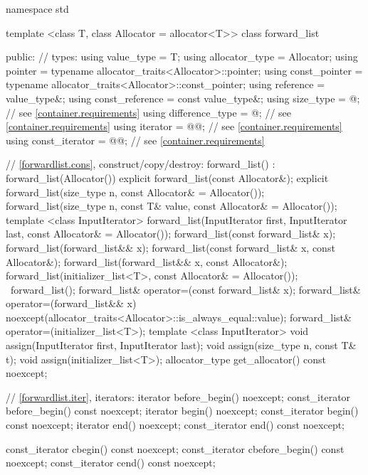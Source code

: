 \begin{codeblock}
namespace std {
  template <class T, class Allocator = allocator<T>>
  class forward_list {
  public:
    // types:
    using value_type      = T;
    using allocator_type  = Allocator;
    using pointer         = typename allocator_traits<Allocator>::pointer;
    using const_pointer   = typename allocator_traits<Allocator>::const_pointer;
    using reference       = value_type&;
    using const_reference = const value_type&;
    using size_type       = @\impdef@; // see \ref{container.requirements}
    using difference_type = @\impdef@; // see \ref{container.requirements}
    using iterator        = @@; // see \ref{container.requirements}
    using const_iterator  = @@; // see \ref{container.requirements}

    // \ref{forwardlist.cons}, construct/copy/destroy:
    forward_list() : forward_list(Allocator()) { }
    explicit forward_list(const Allocator&);
    explicit forward_list(size_type n, const Allocator& = Allocator());
    forward_list(size_type n, const T& value,
                 const Allocator& = Allocator());
    template <class InputIterator>
      forward_list(InputIterator first, InputIterator last,
                   const Allocator& = Allocator());
    forward_list(const forward_list& x);
    forward_list(forward_list&& x);
    forward_list(const forward_list& x, const Allocator&);
    forward_list(forward_list&& x, const Allocator&);
    forward_list(initializer_list<T>, const Allocator& = Allocator());
    ~forward_list();
    forward_list& operator=(const forward_list& x);
    forward_list& operator=(forward_list&& x)
      noexcept(allocator_traits<Allocator>::is_always_equal::value);
    forward_list& operator=(initializer_list<T>);
    template <class InputIterator>
      void assign(InputIterator first, InputIterator last);
    void assign(size_type n, const T& t);
    void assign(initializer_list<T>);
    allocator_type get_allocator() const noexcept;

    // \ref{forwardlist.iter}, iterators:
    iterator before_begin() noexcept;
    const_iterator before_begin() const noexcept;
    iterator begin() noexcept;
    const_iterator begin() const noexcept;
    iterator end() noexcept;
    const_iterator end() const noexcept;

    const_iterator cbegin() const noexcept;
    const_iterator cbefore_begin() const noexcept;
    const_iterator cend() const noexcept;

}}
\end{codeblock}
